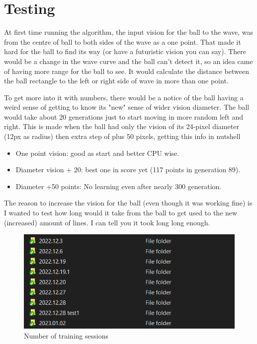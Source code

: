 \chapter{Testing}
At first time running the algorithm, the input vision for the ball to the wave, was from the centre of ball to both sides of the wave as a one point. That made it hard for the ball to find its way (or have a futuristic vision you can say). There would be a change in the wave curve and the ball can't detect it, so an idea came of having more range for the ball to see. It would calculate the distance between the ball rectangle to the left or right side of wave in more than one point.

To get more into it with numbers, there would be a notice of the ball having a weird sense of getting to know its "new" sense of wider vision diameter. The ball would take about 20 generations just to start moving in more random left and right. This is made when the ball had only the vision of its 24-pixel diameter (12px as radius) then extra step of plus 50 pixels, getting this info in nutshell
\begin{itemize}
	\item One point vision: good as start and better CPU wise.
	\item Diameter vision + 20: best one in score yet (117 points in generation 89).
	\item Diameter +50 points: No learning even after nearly 300 generation.
\end{itemize}

The reason to increase the vision for the ball (even though it was working fine) is I wanted to test how long would it take from the ball to get used to the new (increased) amount of lines. I can tell you it took long long enough.

\begin{figure}[H]
	\centering
	\includegraphics[width=0.7\linewidth]{usedImages/numTrainingSessions}
	\caption[]{Number of training sessions}
	\label{fig:numtrainingsessions}
\end{figure}


